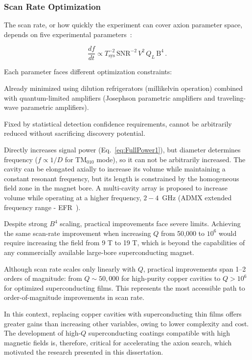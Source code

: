     \subsubsection{Scan Rate Optimization}

    The scan rate, or how quickly the experiment can cover axion parameter space, depends on five experimental parameters~\cite{Braine:2024nzi}:

    \begin{equation}
        \frac{df}{dt} \propto T_{\text{sys}}^{-2} \, \text{SNR}^{-2}  \,   V^{2} \, Q_{L} \, \text{B}^{4} \,.
        \label{eq:scanrate}
    \end{equation}
        
    \noindent Each parameter faces different optimization constraints:
    
    \noindent {} Already minimized using dilution refrigerators (millikelvin operation) combined with quantum-limited amplifiers (Josephson parametric amplifiers and traveling-wave parametric amplifiers).
   
    \noindent {} Fixed by statistical detection confidence requirements, cannot be arbitrarily reduced without sacrificing discovery potential.
    
    \noindent {} Directly increases signal power (Eq.~\ref{eq:FullPower1}), but diameter determines frequency ($f \propto 1/D$ for TM$_{010}$ mode), so it can not be arbitrarily increased. The cavity can be elongated axially to increase its volume while maintaining a constant resonant frequency, but its length is constrained by the homogeneous field zone in the magnet bore. A multi-cavity array is proposed to increase volume while operating at a higher frequency, $2-4$~GHz (ADMX extended frequency range - EFR~\cite{Braine:2024nzi}).  
    
    \noindent {} Despite strong $B^4$ scaling, practical improvements face severe limits. Achieving the same scan-rate improvement when increasing $Q$ from 50,000 to $10^6$ would require increasing the field from 9 T to 19 T, which is beyond the capabilities of any commercially available large-bore superconducting magnet.
    
    \noindent {} Although scan rate scales only linearly with $Q$, practical improvements span 1--2 orders of magnitude: from $Q \sim 50{,}000$ for high-purity copper cavities to $Q > 10^6$ for optimized superconducting films. This represents the most accessible path to order-of-magnitude improvements in scan rate.
        
    In this context, replacing copper cavities with superconducting thin films offers greater gains than increasing other variables, owing to lower complexity and cost. The development of high-$Q$ superconducting coatings compatible with high magnetic fields is, therefore, critical for accelerating the axion search, which motivated the research presented in this dissertation.

